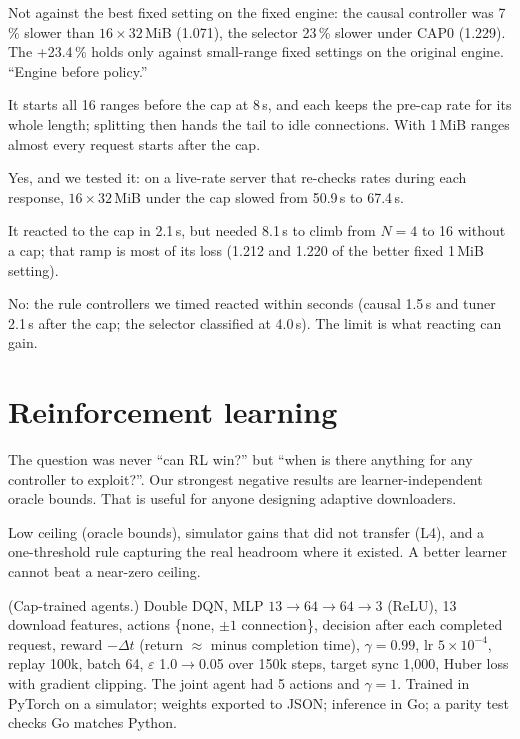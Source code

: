 \A Not against the best fixed setting on the fixed engine: the causal controller was 7\,\% slower than $16\times32$\,MiB (1.071), the selector 23\,\% slower under CAP0 (1.229). The +23.4\,\% holds only against small-range fixed settings on the original engine. ``Engine before policy.''

\A It starts all 16 ranges before the cap at 8\,s, and each keeps the pre-cap rate for its whole length; splitting then hands the tail to idle connections. With 1\,MiB ranges almost every request starts after the cap.

\A Yes, and we tested it: on a live-rate server that re-checks rates during each response, $16\times32$\,MiB under the cap slowed from 50.9\,s to 67.4\,s.

\A It reacted to the cap in 2.1\,s, but needed 8.1\,s to climb from $N=4$ to 16 without a cap; that ramp is most of its loss (1.212 and 1.220 of the better fixed 1\,MiB setting).

\A No: the rule controllers we timed reacted within seconds (causal 1.5\,s and tuner 2.1\,s after the cap; the selector classified at 4.0\,s). The limit is what reacting can gain.

\section{Reinforcement learning}
\A The question was never ``can RL win?'' but ``when is there anything for any controller to exploit?''. Our strongest negative results are learner-independent oracle bounds. That is useful for anyone designing adaptive downloaders.

\A Low ceiling (oracle bounds), simulator gains that did not transfer (L4), and a one-threshold rule capturing the real headroom where it existed. A better learner cannot beat a near-zero ceiling.

\A (Cap-trained agents.) Double DQN, MLP $13\to64\to64\to3$ (ReLU), 13 download features, actions \{none, $\pm1$ connection\}, decision after each completed request, reward $-\Delta t$ (return $\approx$ minus completion time), $\gamma=0.99$, lr $5\times10^{-4}$, replay 100k, batch 64, $\varepsilon$ 1.0$\to$0.05 over 150k steps, target sync 1{,}000, Huber loss with gradient clipping. The joint agent had 5 actions and $\gamma=1$. Trained in PyTorch on a simulator; weights exported to JSON; inference in Go; a parity test checks Go matches Python.

